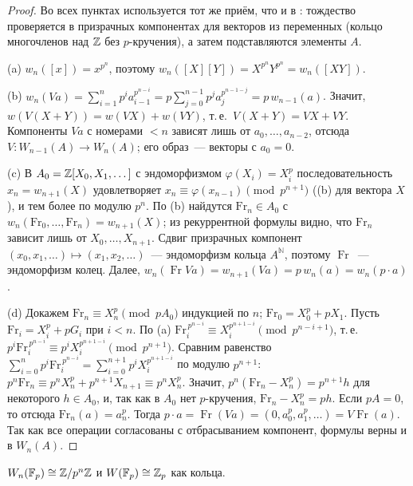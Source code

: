 \begin{proof}
Во всех пунктах используется тот же приём, что и в : тождество проверяется в призрачных компонентах для векторов из
переменных (кольцо многочленов над $\mathbb Z$ без $p$-кручения), а затем подставляются элементы $A$.

(a) $w_n([x])=x^{p^n}$, поэтому $w_n([X][Y])=X^{p^n}Y^{p^n}=w_n([XY])$.

(b) $w_n(Va)=\sum_{i=1}^np^ia_{i-1}^{p^{n-i}}=p\sum_{j=0}^{n-1}p^ja_j^{p^{n-1-j}}=p\,w_{n-1}(a)$. Значит,
$w(V(X+Y))=w(VX)+w(VY)$, т.\,е.\ $V(X+Y)=VX+VY$. Компоненты $Va$ с номерами $<n$ зависят лишь от $a_0,\dots,a_{n-2}$, отсюда
$V\colon W_{n-1}(A)\to W_n(A)$; его образ~--- векторы с $a_0=0$.

(c) В $A_0=\mathbb Z[X_0,X_1,\dots]$ с эндоморфизмом $\varphi(X_i)=X_i^p$ последовательность $x_n=w_{n+1}(X)$ удовлетворяет
$x_n\equiv\varphi(x_{n-1})\pmod{p^{n+1}}$ ((b) для вектора $X$), и тем более по модулю $p^n$. По (b) найдутся
$\mathrm{Fr}_n\in A_0$ с $w_n(\mathrm{Fr}_0,\dots,\mathrm{Fr}_n)=w_{n+1}(X)$; из рекуррентной формулы видно, что
$\mathrm{Fr}_n$ зависит лишь от $X_0,\dots,X_{n+1}$.
Сдвиг призрачных компонент $(x_0,x_1,\dots)\mapsto(x_1,x_2,\dots)$~--- эндоморфизм кольца $A^{\mathbb N}$, поэтому
$\operatorname{Fr}$~--- эндоморфизм колец. Далее, $w_n(\operatorname{Fr}Va)=w_{n+1}(Va)=p\,w_n(a)=w_n(p\cdot a)$.

(d) Докажем $\mathrm{Fr}_n\equiv X_n^p\pmod{pA_0}$ индукцией по $n$; $\mathrm{Fr}_0=X_0^p+pX_1$. Пусть
$\mathrm{Fr}_i=X_i^p+pG_i$ при $i<n$. По (a) $\mathrm{Fr}_i^{\,p^{n-i}}\equiv X_i^{p^{n+1-i}}\pmod{p^{n-i+1}}$, т.\,е.\
$p^i\mathrm{Fr}_i^{\,p^{n-i}}\equiv p^iX_i^{p^{n+1-i}}\pmod{p^{n+1}}$. Сравним равенство
$\sum_{i=0}^np^i\mathrm{Fr}_i^{\,p^{n-i}}=\sum_{i=0}^{n+1}p^iX_i^{p^{n+1-i}}$ по модулю $p^{n+1}$:
$p^n\mathrm{Fr}_n\equiv p^nX_n^p+p^{n+1}X_{n+1}\equiv p^nX_n^p$. Значит, $p^n(\mathrm{Fr}_n-X_n^p)=p^{n+1}h$ для некоторого
$h\in A_0$, и, так как в $A_0$ нет $p$-кручения, $\mathrm{Fr}_n-X_n^p=ph$. Если $pA=0$, то отсюда $\mathrm{Fr}_n(a)=a_n^p$.
Тогда $p\cdot a=\operatorname{Fr}(Va)=(0,a_0^p,a_1^p,\dots)=V\operatorname{Fr}(a)$.
Так как все операции согласованы с отбрасыванием компонент, формулы верны и в $W_n(A)$.
\end{proof}

\begin{proposition}[5.32p]
$W_n(\mathbb F_p)\cong\mathbb Z/p^n\mathbb Z$ и $W(\mathbb F_p)\cong\mathbb Z_p$ как кольца.
\end{proposition}


